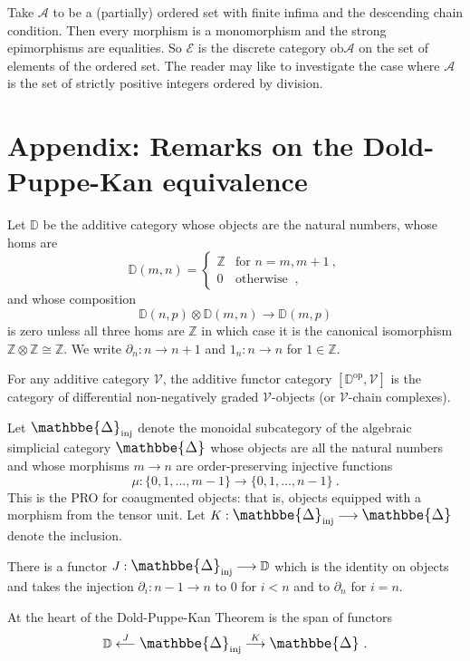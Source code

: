 \documentclass[a4paper,12pt,reqno]{amsart}
\def\makebigger#1#2#3{\hbox{#1$\mathsurround=0pt #2{#3}$}}
\def\bigger#1#2{{\relax\mathpalette{\makebigger#1}{#2}}}
\newcommand{\DelCat}{{\bigger\large{\mathbbe{\Delta}}}}
\theoremstyle{definition}
\theoremstyle{fact}
\theoremstyle{genquest}
\theoremstyle{step}
\newcommand{\lra}{\longrightarrow}
\newcommand{\lla}{\longleftarrow}
\def\CA{{\mathscr A}}
\def\CE{{\mathscr E}}
\def\CV{{\mathscr V}}
\begin{document}
Take $\CA$ to be a (partially) ordered set with finite infima and the descending chain condition. 
Then every morphism is a monomorphism
and the strong epimorphisms are equalities. So $\CE$ is
the discrete category $\mathrm{ob}\CA$ on the set of
elements of the ordered set. The reader may like to investigate
the case where $\CA$ is the set of strictly positive integers
ordered by division. 

\section{Appendix: Remarks on the Dold-Puppe-Kan equivalence}\label{DPK}

Let $\mathbb{D}$ be the additive category whose objects are the natural numbers,
whose homs are
\begin{equation*}
\mathbb{D}(m,n) =
\begin{cases}
\mathbb{Z} & \text{for } n=m,m+1 \ , \\
0 & \text{otherwise } \ ,
\end{cases}
\end{equation*}
and whose composition
$$\mathbb{D}(n,p)\otimes \mathbb{D}(m,n)\lra \mathbb{D}(m,p)$$
is zero unless all three homs are $\mathbb{Z}$ in which case it
is the canonical isomorphism $\mathbb{Z}\otimes \mathbb{Z}\cong \mathbb{Z}$.
We write $\partial_n : n\lra n+1$ and $1_n : n\lra n$ for $1\in \mathbb{Z}$.

For any additive category $\CV$, the additive functor category 
$[\mathbb{D}^{\mathrm{op}},\CV]$
is the category of differential non-negatively graded $\CV$-objects
(or $\CV$-chain complexes).

Let $\DelCat_{\mathrm{inj}}$ denote the monoidal subcategory of the algebraic simplicial category $\DelCat$ whose objects are all the natural numbers and whose morphisms $m\lra n$ are order-preserving injective functions 
$$\mu : \{0, 1, \dots , m-1\}\lra \{0, 1, \dots , n-1\} \ .$$
This is the PRO for coaugmented objects: that is, objects equipped with
a morphism from the tensor unit. Let $K:\DelCat_{\mathrm{inj}}\lra \DelCat$ 
denote the inclusion.

There is a functor $J: \DelCat_{\mathrm{inj}} \lra \mathbb{D}$ which
is the identity on objects and takes the injection $\partial_i : n-1\lra n$
to $0$ for $i<n$ and to $\partial_n$ for $i=n$.

At the heart of the Dold-Puppe-Kan Theorem is the span of functors
$$\mathbb{D}\stackrel{J}\lla \DelCat_{\mathrm{inj}}\stackrel{K}\lra \DelCat \ .$$ 
\end{document}
